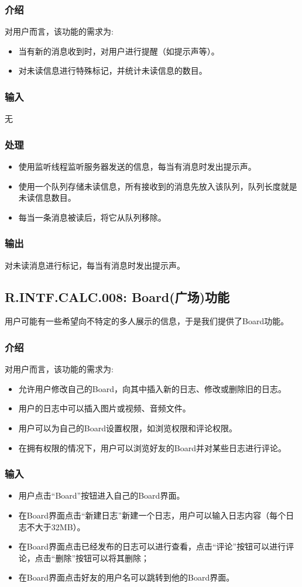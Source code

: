 \subsubsection{介绍}
对用户而言，该功能的需求为:
\begin{itemize}
  \item 当有新的消息收到时，对用户进行提醒（如提示声等）。
  \item 对未读信息进行特殊标记，并统计未读信息的数目。
\end{itemize}
\subsubsection{输入}
无
\subsubsection{处理}
\begin{itemize}
  \item 使用监听线程监听服务器发送的信息，每当有消息时发出提示声。
  \item 使用一个队列存储未读信息，所有接收到的消息先放入该队列，队列长度就是未读信息数目。
  \item 每当一条消息被读后，将它从队列移除。
\end{itemize}
\subsubsection{输出}
对未读消息进行标记，每当有消息时发出提示声。

\subsection{R.INTF.CALC.008: Board(广场)功能}
用户可能有一些希望向不特定的多人展示的信息，于是我们提供了Board功能。
\subsubsection{介绍}
对用户而言，该功能的需求为:
\begin{itemize}
  \item 允许用户修改自己的Board，向其中插入新的日志、修改或删除旧的日志。
  \item 用户的日志中可以插入图片或视频、音频文件。
  \item 用户可以为自己的Board设置权限，如浏览权限和评论权限。
  \item 在拥有权限的情况下，用户可以浏览好友的Board并对某些日志进行评论。
\end{itemize}
\subsubsection{输入}
\begin{itemize}
  \item 用户点击“Board”按钮进入自己的Board界面。
  \item 在Board界面点击“新建日志”新建一个日志，用户可以输入日志内容（每个日志不大于32MB）。
  \item 在Board界面点击已经发布的日志可以进行查看，点击“评论”按钮可以进行评论，点击“删除”按钮可以将其删除；
  \item 在Board界面点击好友的用户名可以跳转到他的Board界面。
\end{itemize}

